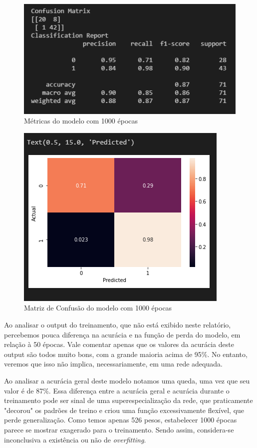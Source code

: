 \documentclass[12pt]{article}
\begin{document}
\begin{figure}[H]
	\centering
	\includegraphics[width=0.7\linewidth]{Imagens/1000epocas/metricas1000epocas}
	\caption{Métricas do modelo com 1000 épocas}
	\label{fig:metricas1000epocas}
\end{figure}
\begin{figure}[H]
	\centering
	\includegraphics[width=0.7\linewidth]{Imagens/1000epocas/confusao1000epocas}
	\caption{Matriz de Confusão do modelo com 1000 épocas}
	\label{fig:confusao1000epocas}
\end{figure}

Ao analisar o output do treinamento, que não está exibido neste relatório, percebemos pouca diferença na acurácia e na função de perda do modelo, em relação à 50 épocas. Vale comentar apenas que os valores da acurácia deste output são todos muito bons, com a grande maioria acima de 95\%. No entanto, veremos que isso não implica, necessariamente, em uma rede adequada.

Ao analisar a acurácia geral deste modelo notamos uma queda, uma vez que seu valor é de 87\%. Essa diferença entre a acurácia geral e acurácia durante o treinamento pode ser sinal de uma superespecialização da rede, que praticamente "decorou" os padrões de treino e criou uma função excessivamente flexível, que perde generalização. Como temos apenas 526 pesos, estabelecer 1000 épocas parece se mostrar exagerado para o treinamento. Sendo assim, considera-se inconclusiva a existência ou não de \textit{overfitting}.
\end{document}
